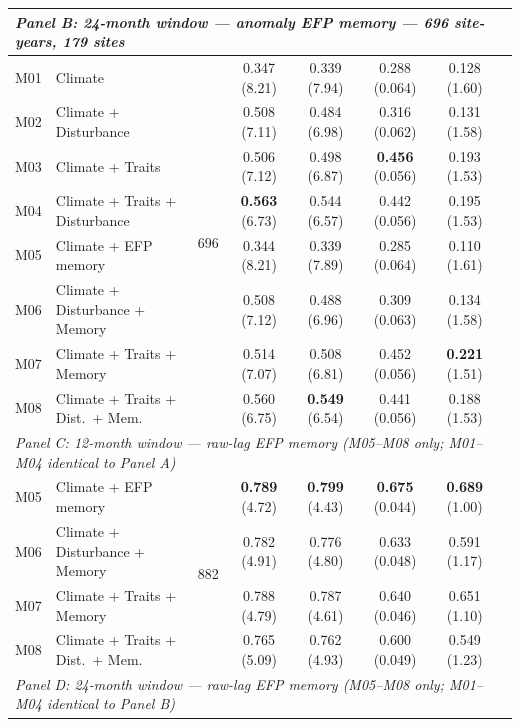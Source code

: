 \begin{table}[htbp]
\begin{tabular}{llcccccc}
\midrule
\multicolumn{7}{l}{\textit{Panel B: 24-month window --- anomaly EFP memory --- 696 site-years, 179 sites}} \\
\midrule
M01 & Climate                          & \multirow{8}{*}{696} & 0.347 (8.21) & 0.339 (7.94) & 0.288 (0.064) & 0.128 (1.60) \\
M02 & Climate + Disturbance            &                      & 0.508 (7.11) & 0.484 (6.98) & 0.316 (0.062) & 0.131 (1.58) \\
M03 & Climate + Traits                 &                      & 0.506 (7.12) & 0.498 (6.87) & \textbf{0.456} (0.056) & 0.193 (1.53) \\
M04 & Climate + Traits + Disturbance   &                      & \textbf{0.563} (6.73) & 0.544 (6.57) & 0.442 (0.056) & 0.195 (1.53) \\
M05 & Climate + EFP memory             &                      & 0.344 (8.21) & 0.339 (7.89) & 0.285 (0.064) & 0.110 (1.61) \\
M06 & Climate + Disturbance + Memory   &                      & 0.508 (7.12) & 0.488 (6.96) & 0.309 (0.063) & 0.134 (1.58) \\
M07 & Climate + Traits + Memory        &                      & 0.514 (7.07) & 0.508 (6.81) & 0.452 (0.056) & \textbf{0.221} (1.51) \\
M08 & Climate + Traits + Dist.\ + Mem. &                      & 0.560 (6.75) & \textbf{0.549} (6.54) & 0.441 (0.056) & 0.188 (1.53) \\
\midrule
\multicolumn{7}{l}{\textit{Panel C: 12-month window --- raw-lag EFP memory (M05--M08 only; M01--M04 identical to Panel A)}} \\
\midrule
M05 & Climate + EFP memory             & \multirow{4}{*}{882} & \textbf{0.789} (4.72) & \textbf{0.799} (4.43) & \textbf{0.675} (0.044) & \textbf{0.689} (1.00) \\
M06 & Climate + Disturbance + Memory   &                      & 0.782 (4.91) & 0.776 (4.80) & 0.633 (0.048) & 0.591 (1.17) \\
M07 & Climate + Traits + Memory        &                      & 0.788 (4.79) & 0.787 (4.61) & 0.640 (0.046) & 0.651 (1.10) \\
M08 & Climate + Traits + Dist.\ + Mem. &                      & 0.765 (5.09) & 0.762 (4.93) & 0.600 (0.049) & 0.549 (1.23) \\
\midrule
\multicolumn{7}{l}{\textit{Panel D: 24-month window --- raw-lag EFP memory (M05--M08 only; M01--M04 identical to Panel B)}} \\
\midrule

\end{tabular}
\end{table}
